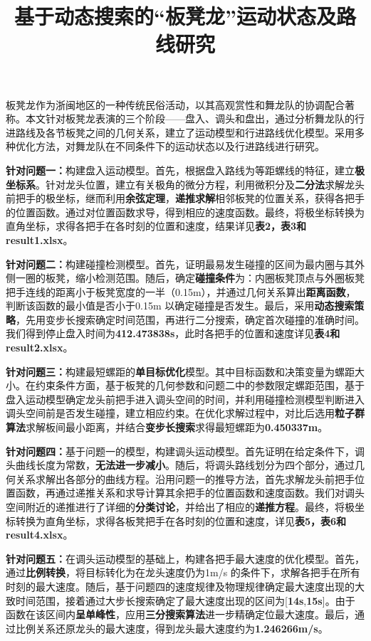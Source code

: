 \documentclass[withoutpreface,bwprint]{cumcmthesis}
\title{基于动态搜索的“板凳龙”运动状态及路线研究}
\makeatletter
\renewenvironment{abstract}{%
\if@twocolumn
    \section*{\abstractname}%
  \else
   \begin{center}%
  {\zihao{4}\bfseries \abstractname\vspace{-.5em}\vspace{\z@}}%
   \end{center}%
   \quotation
  \fi}
  {\if@twocolumn\else\endquotation\clearpage\fi}
\makeatother
\begin{document}
\maketitle

\begin{abstract}
板凳龙作为浙闽地区的一种传统民俗活动，以其高观赏性和舞龙队的协调配合著称。本文针对板凳龙表演的三个阶段——盘入、调头和盘出，通过分析舞龙队的行进路线及各节板凳之间的几何关系，建立了运动模型和行进路线优化模型。采用多种优化方法，对舞龙队在不同条件下的运动状态以及行进路线进行研究。

\textbf{针对问题一：}构建盘入运动模型。首先，根据盘入路线为等距螺线的特征，建立\textbf{极坐标系}。针对龙头位置，建立有关极角的微分方程，利用微积分及\textbf{二分法}求解龙头前把手的极坐标，继而利用\textbf{余弦定理}，\textbf{递推求解}相邻板凳的位置关系，获得各把手的位置函数。通过对位置函数求导，得到相应的速度函数。最终，将极坐标转换为直角坐标，求得各把手在各时刻的位置和速度，结果详见\textbf{表2，表3和result1.xlsx}。

\textbf{针对问题二：}构建碰撞检测模型。首先，证明最易发生碰撞的区间为最内圈与其外侧一圈的板凳，缩小检测范围。随后，确定\textbf{碰撞条件}为：内圈板凳顶点与外圈板凳把手连线的距离小于板凳宽度的一半（0.15m），并通过几何关系算出\textbf{距离函数}，判断该函数的最小值是否小于0.15m 以确定碰撞是否发生。最后，采用\textbf{动态搜索策略}，先用变步长搜索确定时间范围，再进行二分搜索，确定首次碰撞的准确时间。我们得到停止盘入时间为\textbf{412.473838s}，此时各把手的位置和速度详见\textbf{表4和result2.xlsx}。

\textbf{针对问题三：}构建最短螺距的\textbf{单目标优化}模型。其中目标函数和决策变量为螺距大小。在约束条件方面，基于板凳的几何参数和问题二中的参数限定螺距范围，基于盘入运动模型确定龙头前把手进入调头空间的时间，并利用碰撞检测模型判断进入调头空间前是否发生碰撞，建立相应约束。在优化求解过程中，对比后选用\textbf{粒子群算法}求解板间最小距离，并结合\textbf{变步长搜索}求得最短螺距为\textbf{0.450337m}。

\textbf{针对问题四：}基于问题一的模型，构建调头运动模型。首先证明在给定条件下，调头曲线长度为常数，\textbf{无法进一步减小}。随后，将调头路线划分为四个部分，通过几何关系求解出各部分的曲线方程。沿用问题一的推导方法，首先求解龙头前把手位置函数，再通过递推关系和求导计算其余把手的位置函数和速度函数。我们对调头空间附近的递推进行了详细的\textbf{分类讨论}，并给出了相应的\textbf{递推方程}。最终，将极坐标转换为直角坐标，求得各板凳把手在各时刻的位置和速度，详见\textbf{表5，表6和result4.xlsx}。

\textbf{针对问题五：}在调头运动模型的基础上，构建各把手最大速度的优化模型。首先，通过\textbf{比例转换}，将目标转化为在龙头速度仍为1m/s 的条件下，求解各把手在所有时刻的最大速度。随后，基于问题四的速度规律及物理规律确定最大速度出现的大致时间范围，接着通过大步长搜索确定了最大速度出现的区间为[\textbf{14s},\textbf{15s}]。由于函数在该区间内\textbf{呈单峰性}，应用\textbf{三分搜索算法}进一步精确定位最大速度。最后，通过比例关系还原龙头的最大速度，得到龙头最大速度约为\textbf{1.246266m/s}。

\end{abstract}
\end{document}
